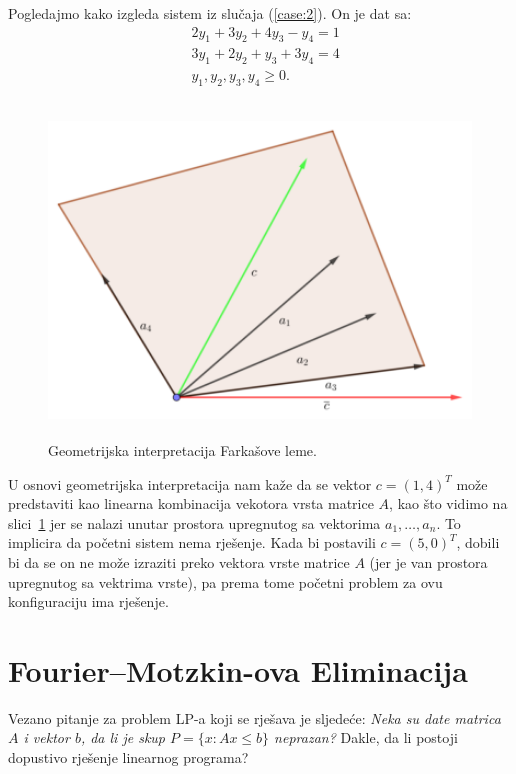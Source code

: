 \documentclass[a4paper, utf8, 11pt, colorlinks]{book}
\begin{document}
Pogledajmo kako izgleda sistem iz slučaja (\ref{case:2}). On je dat sa:
\begin{align*}
	&2 y_1 + 3 y_2 + 4 y_3 - y_4 = 1\\
	&3y_1 + 2 y_2 + y_3 + 3 y_4 = 4 \\
	& y_1, y_2, y_3, y_4 \geq 0. 
\end{align*}
\begin{figure}[!ht]
	\centering
	\includegraphics[width=320pt, height=250pt]{farkas-geometry.eps}
	\vspace{-1cm}
	\caption{Geometrijska interpretacija Farkašove leme.}
	\label{fig:farkas-slika}
\end{figure}
U osnovi geometrijska interpretacija nam kaže da se vektor $c =(1,4)^T$ može predstaviti kao linearna kombinacija vekotora vrsta matrice $A$, kao što vidimo na slici~\ref{fig:farkas-slika} jer se nalazi unutar prostora upregnutog sa vektorima $a_1, \ldots, a_n$.  To implicira da početni sistem nema rješenje. 
Kada bi postavili $c=(5,0)^T$, dobili bi da se on ne može izraziti preko vektora vrste matrice $A$ (jer je van prostora upregnutog sa vektrima vrste), pa prema tome početni problem za ovu konfiguraciju ima rješenje.  

\section{Fourier–Motzkin-ova Eliminacija}
Vezano pitanje za problem  LP-a koji se rješava  je sljedeće:
\emph{Neka su date matrica $A$ i vektor $b$, da li je skup $P = \{x: A x \leq b\}$ neprazan?} Dakle, da li postoji dopustivo rješenje linearnog programa? 
\end{document}
